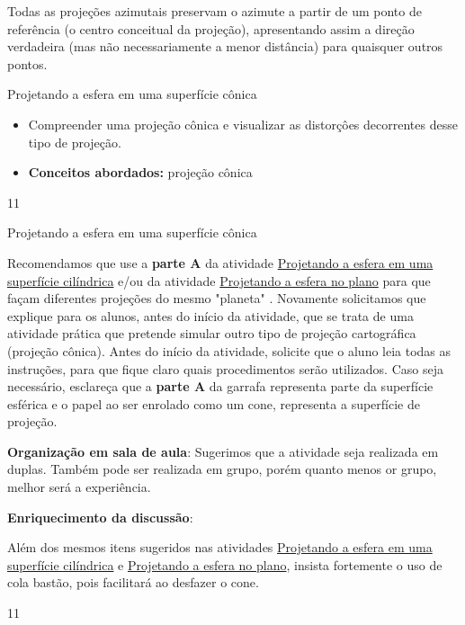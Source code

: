 Todas as projeções azimutais preservam o azimute a partir de um ponto de referência (o centro conceitual da projeção), apresentando assim a direção verdadeira (mas não necessariamente a menor distância) para quaisquer outros pontos. 

\cleardoublepage
\def\currentcolor{session1}
\begin{objectives}{Projetando a esfera em uma superfície cônica}
{ \begin{itemize}
  \item Compreender uma projeção cônica e visualizar as distorçôes decorrentes desse tipo de projeção.
  \item \textbf{Conceitos abordados:} projeção cônica
  \end{itemize}
}{1}{1}
\end{objectives}
\begin{sugestions}{Projetando a esfera em uma superfície cônica}
{
  Recomendamos que use a \textbf{parte A} da atividade \hyperref[proj_cil]{Projetando a esfera em uma superfície cilíndrica}   e/ou da atividade  \hyperref[proj-planas]{Projetando a esfera no plano} para que façam diferentes projeções do mesmo "planeta" . Novamente solicitamos que  explique para os alunos, antes do início da atividade, que se trata de uma atividade prática que pretende simular outro tipo de projeção cartográfica (projeção cônica).  Antes do início da atividade, solicite que o aluno leia todas as instruções, para que fique claro quais procedimentos serão utilizados. Caso seja necessário, esclareça que a \textbf{parte A} da garrafa representa parte da superfície esférica e o papel ao ser enrolado como um cone, representa a superfície de projeção.

  \textbf{Organização em sala de aula}: Sugerimos que a atividade seja realizada em duplas. Também pode ser realizada em grupo, porém quanto menos or grupo, melhor será a experiência.

  \textbf{Enriquecimento da discussão}:
  
 Além dos mesmos itens sugeridos nas atividades \hyperref[proj_cil]{Projetando a esfera em uma superfície cilíndrica}   e \hyperref[proj-planas]{Projetando a esfera no plano}, insista fortemente o uso de cola bastão, pois facilitará ao desfazer o cone.
}{1}{1}
\end{sugestions}
\clearmargin
